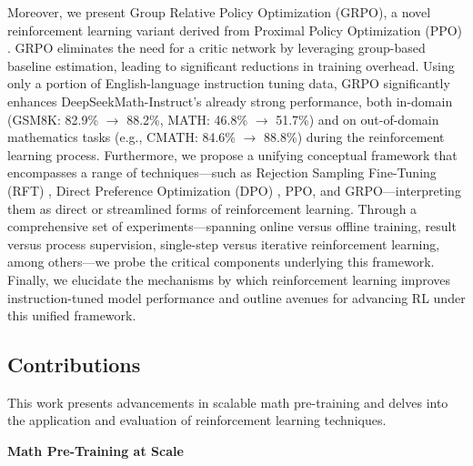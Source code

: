 Moreover, we present Group Relative Policy Optimization (GRPO), a novel reinforcement learning variant derived from Proximal Policy Optimization (PPO) \citep{schulman2017proximal}. GRPO eliminates the need for a critic network by leveraging group-based baseline estimation, leading to significant reductions in training overhead. Using only a portion of English-language instruction tuning data, GRPO significantly enhances DeepSeekMath-Instruct’s already strong performance, both in-domain (GSM8K: 82.9\% $\rightarrow$ 88.2\%, MATH: 46.8\% $\rightarrow$ 51.7\%) and on out-of-domain mathematics tasks (e.g., CMATH: 84.6\% $\rightarrow$ 88.8\%) during the reinforcement learning process. Furthermore, we propose a unifying conceptual framework that encompasses a range of techniques—such as Rejection Sampling Fine-Tuning (RFT) \citep{yuan2023scaling}, Direct Preference Optimization (DPO) \citep{dpo}, PPO, and GRPO—interpreting them as direct or streamlined forms of reinforcement learning. Through a comprehensive set of experiments—spanning online versus offline training, result versus process supervision, single-step versus iterative reinforcement learning, among others—we probe the critical components underlying this framework. Finally, we elucidate the mechanisms by which reinforcement learning improves instruction-tuned model performance and outline avenues for advancing RL under this unified framework.

\subsection{Contributions}
This work presents advancements in scalable math pre-training and delves into the application and evaluation of reinforcement learning techniques.

\textbf{Math Pre-Training at Scale}

